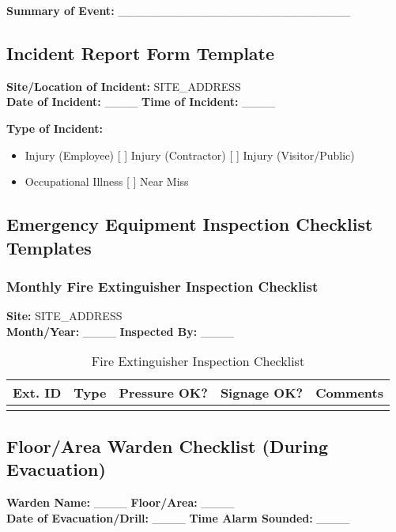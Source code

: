 \documentclass[11pt]{article}
\newcommand{\siteAddress}{{{SITE_ADDRESS}}}
\begin{document}
\textbf{Summary of Event:}
\_\_\_\_\_\_\_\_\_\_\_\_\_\_\_\_\_\_\_\_\_\_\_\_\_\_\_\_

\subsection*{Incident Report Form Template}

\textbf{Site/Location of Incident:} \siteAddress \\
\textbf{Date of Incident:} \_\_\_\_ \textbf{Time of Incident:} \_\_\_\_

\textbf{Type of Incident:}
\begin{itemize}
    \item [ ] Injury (Employee) [ ] Injury (Contractor) [ ] Injury (Visitor/Public)
    \item [ ] Occupational Illness [ ] Near Miss
\end{itemize}

\subsection*{Emergency Equipment Inspection Checklist Templates}

\subsubsection*{Monthly Fire Extinguisher Inspection Checklist}

\textbf{Site:} \siteAddress \\
\textbf{Month/Year:} \_\_\_\_ \textbf{Inspected By:} \_\_\_\_

\begin{table}[h]
    \centering
    \begin{tabular}{p{3cm}p{3cm}p{2cm}p{3cm}p{3cm}}
        \toprule
        \textbf{Ext. ID} & \textbf{Type} & \textbf{Pressure OK?} & \textbf{Signage OK?} & \textbf{Comments} \\
        \midrule
        & & & & \\
        \bottomrule
    \end{tabular}
    \caption{Fire Extinguisher Inspection Checklist}
\end{table}

\subsection*{Floor/Area Warden Checklist (During Evacuation)}

\textbf{Warden Name:} \_\_\_\_ \textbf{Floor/Area:} \_\_\_\_ \\
\textbf{Date of Evacuation/Drill:} \_\_\_\_ \textbf{Time Alarm Sounded:} \_\_\_\_
\end{document}
